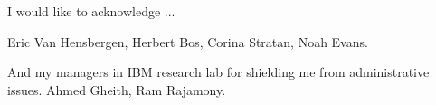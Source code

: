 

\begin{acknowledgements}      %

I would like to acknowledge ...

Eric Van Hensbergen, 
Herbert Bos,
Corina Stratan,
Noah Evans.


And my managers in IBM research lab for shielding me from administrative issues.
Ahmed Gheith,
Ram Rajamony.


\end{acknowledgements}


